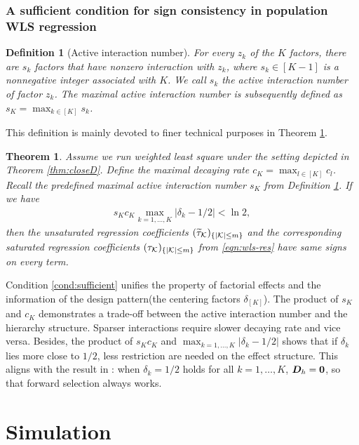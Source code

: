 \documentclass[12pt]{article}
\newtheorem{definition}{Definition}
\newtheorem{theorem}{Theorem}
\begin{document}
\subsubsection{A sufficient condition for sign consistency in population WLS regression}

\begin{definition}[Active interaction number]\label{def:sparsity}
For every $z_k$ of the $K$ factors, there are $s_k$ factors that have nonzero interaction with $z_k$, where $s_k\in [K-1]$ is a nonnegative integer associated with $K$. We call $s_k$ the active interaction number of factor $z_k$. The maximal active interaction number is subsequently defined as $s_K = \max_{k\in [K]} s_k$.
\end{definition}

This definition is mainly devoted to finer technical purposes in Theorem \ref{thm:suffcond}. 

\begin{theorem}\label{thm:suffcond}
Assume we run weighted least square under the setting depicted in  Theorem \ref{thm:closeD}. Define the maximal decaying rate $c_K=\max_{l\in[K]} c_l$. Recall the predefined maximal active interaction number $s_K$ from Definition \ref{def:sparsity}. If we have 
\begin{align}
s_Kc_K\max_{k=1,\dots,K} |\delta_k-1/2|<\ln 2, \label{cond:sufficient}
\end{align}
then the unsaturated regression coefficients
$(\widetilde{\tau}_{{\mathcal{K}}})_{\{|{\mathcal{K}}|\le m\}}$ and the corresponding saturated regression coefficients  $({\tau}_{{\mathcal{K}}})_{\{|{\mathcal{K}}|\le m\}}$ from \eqref{eqn:wls-res} have same signs on every term.

\end{theorem}

Condition \eqref{cond:sufficient} unifies the property of factorial effects and the information of the design pattern(the centering factors $\delta_{[K]}$). The product of $s_K$ and $c_K$ demonstrates a trade-off between the active interaction number and the hierarchy structure. Sparser interactions require slower decaying rate and vice versa. Besides, the product of $s_Kc_K$ and $\max_{k=1,\dots,K} |\delta_k-1/2|$ shows that if $\delta_k$ lies more close to $1/2$, less restriction are needed on the effect structure. This aligns with the result in \cite{zhao2021regression}: when $\delta_k=1/2$ holds for all $k=1,\dots, K$,  ${\boldsymbol{D}}_h=\boldsymbol{0}$, so that forward selection always works. 

\section{Simulation}
\end{document}
